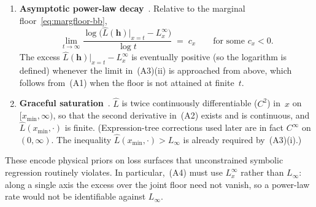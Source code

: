 \documentclass[11pt]{article}
\newcommand{\bbH}{\mathbb{H}}
\newcommand{\Lhat}{\hat{L}}
\theoremstyle{plain}
\theoremstyle{remark}
\begin{document}
\begin{enumerate}[nosep, leftmargin=2.2em, label=\textup{(A\arabic*)}]
\begin{enumerate}[nosep, leftmargin=1.4em, label=\textup{(\roman*)}]
    \end{enumerate}
    In the stage-0 Chinchilla law, $L_\infty$ equals the joint limit as all scales
    $\to\infty$ (namely~$E$), while a single-axis marginal is in general strictly
    larger.
    Joint-floor positivity~$L_\infty>0$ already forces~$\Lhat>0$ on~$\widetilde{\bbH}$, so a
    separate positivity axiom is unnecessary.
    \item \textbf{Asymptotic power-law decay}~\citep{hestness2017scaling,kaplan2020scaling,hoffmann2022chinchilla}.
    Relative to the marginal floor~\eqref{eq:margfloor-bb},
    \begin{equation}\label{eq:powerlaw-bb}
        \lim_{t\to\infty}
        \frac{\log\bigl(\Lhat(\mathbf{h})\big|_{x=t}
            - L^{\infty}_{x}\bigr)}{\log t}
        \;=\; c_x
        \qquad\text{for some } c_x < 0.
    \end{equation}
    The excess $\Lhat(\mathbf{h})|_{x=t}-L^{\infty}_{x}$ is eventually positive (so the
    logarithm is defined) whenever the limit in~(A3)(ii) is approached from above,
    which follows from~(A1) when the floor is not attained at finite~$t$.
    \item \textbf{Graceful saturation}~\citep{kronberger2022shape}.
    $\Lhat$ is twice continuously differentiable ($C^2$) in~$x$ on $[x_{\min}, \infty)$,
    so that the second derivative in~(A2) exists and is continuous, and
    $\Lhat(x_{\min}, \cdot)$ is finite.
    (Expression-tree corrections used later are in fact $C^\infty$ on $(0,\infty)$.
    The inequality $\Lhat(x_{\min},\cdot)>L_\infty$ is already required by~(A3)(i).)
\end{enumerate}

These encode physical priors on loss surfaces that unconstrained symbolic regression routinely violates.
In particular,~(A4) must use $L^{\infty}_{x}$ rather than $L_\infty$: along a single axis the excess over the joint floor need not vanish, so a power-law rate would not be identifiable against $L_\infty$.
\end{document}
